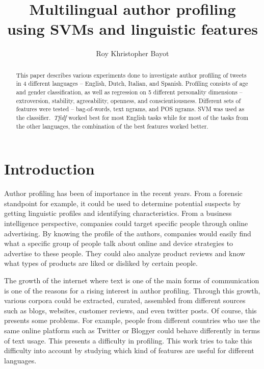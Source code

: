 \documentclass[a4paper]{llncs}
\begin{document}
\title{Multilingual author profiling \\using SVMs and linguistic features}
\titlerunning{}
\author{Roy Khristopher Bayot}

\maketitle
\begin{abstract}
This paper describes various experiments done to investigate author profiling of tweets in 4 different languages – English, Dutch, Italian, and Spanish. Profiling consists of age and gender classification, as well as regression on 5 different personality dimensions – extroversion, stability, agreeability, openness, and conscientiousness. Different sets of features were tested – bag-of-words, text ngrams, and POS ngrams. SVM was used as the classifier.~\textit{Tfidf} worked best for most English tasks while for most of the tasks from the other languages, the combination of the best features worked better. 
\end{abstract}

\section{Introduction}
Author profiling has been of importance in the recent years. From a forensic standpoint for example, it could be used to determine potential suspects by getting linguistic profiles and identifying characteristics. From a business intelligence perspective, companies could target specific people through online advertising. By knowing the profile of the authors, companies would easily find what a specific group of people talk about online and device strategies to advertise to these people. They could also analyze product reviews and know what types of products are liked or disliked by certain people. 

The growth of the internet where text is one of the main forms of communication is one of the reasons for a rising interest in author profiling. Through this growth, various corpora could be extracted, curated, assembled from different sources such as blogs, websites, customer reviews, and even twitter posts. Of course, this presents some problems. For example, people from different countries who use the same online platform such as Twitter or Blogger could behave differently in terms of text usage. This presents a difficulty in profiling. This work tries to take this difficulty into account by studying which kind of features are useful for different languages. 
\end{document}
